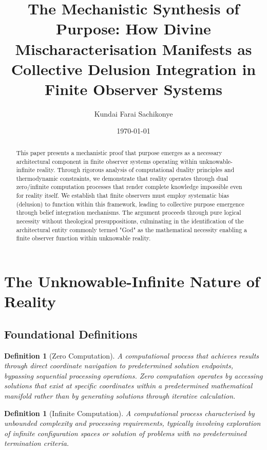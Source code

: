 \documentclass[12pt,a4paper]{article}
\title{The Mechanistic Synthesis of Purpose: How Divine Mischaracterisation Manifests as Collective Delusion Integration in Finite Observer Systems}
\author{Kundai Farai Sachikonye}
\date{\today}
\newtheorem{definition}[theorem]{Definition}
\begin{document}
\maketitle

\begin{abstract}
This paper presents a mechanistic proof that purpose emerges as a necessary architectural component in finite observer systems operating within unknowable-infinite reality. Through rigorous analysis of computational duality principles and thermodynamic constraints, we demonstrate that reality operates through dual zero/infinite computation processes that render complete knowledge impossible even for reality itself. We establish that finite observers must employ systematic bias (delusion) to function within this framework, leading to collective purpose emergence through belief integration mechanisms. The argument proceeds through pure logical necessity without theological presuppositions, culminating in the identification of the architectural entity commonly termed "God" as the mathematical necessity enabling a finite observer function within unknowable reality.
\end{abstract}

\tableofcontents

\section{The Unknowable-Infinite Nature of Reality}

\subsection{Foundational Definitions}

\begin{definition}[Zero Computation]
A computational process that achieves results through direct coordinate navigation to predetermined solution endpoints, bypassing sequential processing operations. Zero computation operates by accessing solutions that exist at specific coordinates within a predetermined mathematical manifold rather than by generating solutions through iterative calculation.
\end{definition}

\begin{definition}[Infinite Computation] 
A computational process characterised by unbounded complexity and processing requirements, typically involving exploration of infinite configuration spaces or solution of problems with no predetermined termination criteria.
\end{definition}
\end{document}
